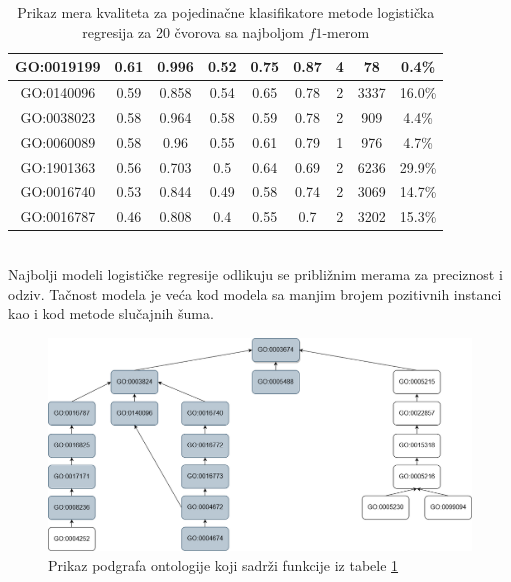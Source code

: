 \begin{table}[h]
\begin{tabular}{|c|c|c|c|c|c|c|c|c|}
		\hline
		GO:0019199 & 0.61 & 0.996 & 0.52 & 0.75 & 0.87 & 4 & 78 & 0.4\% \\
		\hline
		GO:0140096 & 0.59 & 0.858 & 0.54 & 0.65 & 0.78 & 2 & 3337 & 16.0\% \\
		\hline
		GO:0038023 & 0.58 & 0.964 & 0.58 & 0.59 & 0.78 & 2 & 909 & 4.4\% \\
		\hline
		GO:0060089 & 0.58 & 0.96 & 0.55 & 0.61 & 0.79 & 1 & 976 & 4.7\% \\
		\hline
		GO:1901363 & 0.56 & 0.703 & 0.5 & 0.64 & 0.69 & 2 & 6236 & 29.9\% \\
		\hline
		GO:0016740 & 0.53 & 0.844 & 0.49 & 0.58 & 0.74 & 2 & 3069 & 14.7\% \\
		\hline
		GO:0016787 & 0.46 & 0.808 & 0.4 & 0.55 & 0.7 & 2 & 3202 & 15.3\% \\
		\hline
	\end{tabular}
	\caption{Prikaz mera kvaliteta za pojedina\v cne klasifikatore metode logistička regresija  za 20 \v cvorova sa najboljom $f1$-merom}
	\label{tab: lrF1}
\end{table}

~\\ 
Najbolji modeli logističke regresije odlikuju se približnim merama za preciznost i odziv. Tačnost modela je veća kod modela sa manjim brojem pozitivnih instanci kao i kod metode slučajnih šuma.

\begin{figure}[H]
	\centering
	\includegraphics[width=\textwidth]{Figures/LRo.png}
	\caption{Prikaz podgrafa ontologije koji sadrži funkcije iz tabele \ref{tab: lrF1}}
	\label{fig:lr_ontology}
\end{figure}

